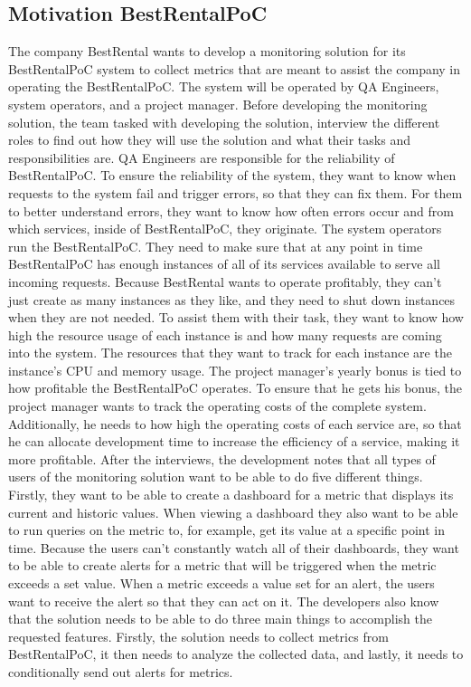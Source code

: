 \subsection{Motivation BestRentalPoC}
The company \Gls{BestRental} wants to develop a monitoring solution for its \Gls{BestRentalPoC} system
to collect metrics that are meant to assist the company in operating the BestRentalPoC.
The system will be operated by QA Engineers, system operators, and a project manager.
Before developing the monitoring solution, the team tasked with developing the solution,
interview the different roles to find out how they will use the solution
and what their tasks and responsibilities are.
QA Engineers are responsible for the reliability of BestRentalPoC.
To ensure the reliability of the system, they want to know when requests to the system fail and
trigger errors, so that they can fix them.
For them to better understand errors, they want to know how often errors occur and from which services,
inside of BestRentalPoC, they originate.
The system operators run the BestRentalPoC. They need to make sure that at any point in time
\Gls{BestRentalPoC} has enough instances of all of its services available to serve all incoming requests.
Because \Gls{BestRental} wants to operate profitably, they can't just create as many instances as they like,
and they need to shut down instances when they are not needed.
To assist them with their task, they want to know how high the resource usage of each instance is
and how many requests are coming into the system. The resources that they want to track for each
instance are the instance's CPU and memory usage.
The project manager's yearly bonus is tied to how profitable the \Gls{BestRentalPoC} operates.
To ensure that he gets his bonus, the project manager wants to track the operating costs of the complete system.
Additionally, he needs to how high the operating costs of each service are, so that he can
allocate development time to increase the efficiency of a service, making it more profitable.
After the interviews, the development notes that all types of users of the monitoring solution
want to be able to do five different things.
Firstly, they want to be able to create a dashboard for a metric that displays its current and historic values.
When viewing a dashboard they also want to be able to run queries on the metric to, for example, get
its value at a specific point in time.
Because the users can't constantly watch all of their dashboards, they want to be able to create
alerts for a metric that will be triggered when the metric exceeds a set value.
When a metric exceeds a value set for an alert, the users want to receive the alert so that they can act on it.
The developers also know that the solution needs to be able to do three main things to accomplish
the requested features.
Firstly, the solution needs to collect metrics from BestRentalPoC,
it then needs to analyze the collected data, and lastly, it needs to conditionally send out alerts
for metrics.

